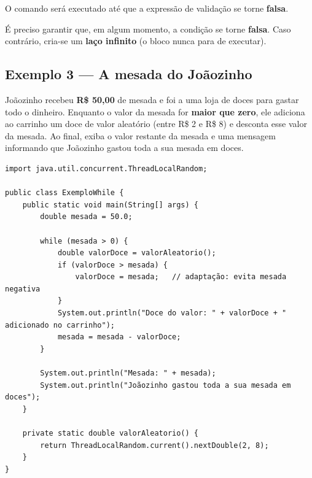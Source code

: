 \documentclass[12pt,a4paper]{article}
\begin{document}
O comando será executado até que a expressão de validação se torne \textbf{falsa}.

\begin{observacao}
É preciso garantir que, em algum momento, a condição se torne \textbf{falsa}.
Caso contrário, cria-se um \textbf{laço infinito} (o bloco nunca para de
executar).
\end{observacao}

\subsection{Exemplo 3 --- A mesada do Joãozinho}

\begin{enunciado}
Joãozinho recebeu \textbf{R\$ 50,00} de mesada e foi a uma loja de doces para
gastar todo o dinheiro. Enquanto o valor da mesada for \textbf{maior que zero},
ele adiciona ao carrinho um doce de valor aleatório (entre R\$ 2 e R\$ 8) e
desconta esse valor da mesada. Ao final, exiba o valor restante da mesada e uma
mensagem informando que Joãozinho gastou toda a sua mesada em doces.
\end{enunciado}

\begin{solucao}
\begin{lstlisting}[caption={ExemploWhile.java}]
import java.util.concurrent.ThreadLocalRandom;

public class ExemploWhile {
    public static void main(String[] args) {
        double mesada = 50.0;

        while (mesada > 0) {
            double valorDoce = valorAleatorio();
            if (valorDoce > mesada) {
                valorDoce = mesada;   // adaptação: evita mesada negativa
            }
            System.out.println("Doce do valor: " + valorDoce + " adicionado no carrinho");
            mesada = mesada - valorDoce;
        }

        System.out.println("Mesada: " + mesada);
        System.out.println("Joãozinho gastou toda a sua mesada em doces");
    }

    private static double valorAleatorio() {
        return ThreadLocalRandom.current().nextDouble(2, 8);
    }
}
\end{lstlisting}
\end{solucao}
\end{document}
